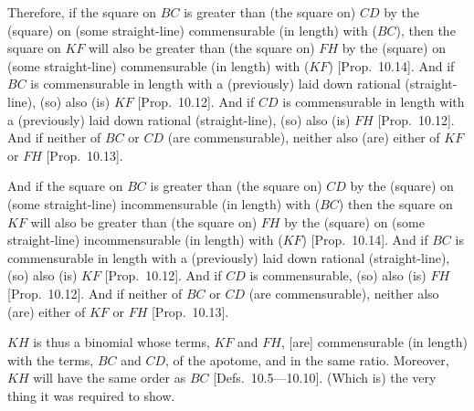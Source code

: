 \begin{Parallel}{}{}
{Therefore,  if the square on $BC$ is greater than (the square on) $CD$
by the (square) on (some straight-line) commensurable (in length) with ($BC$), 
then the square on $KF$ will also be greater than (the square on) $FH$
by the (square) on (some straight-line) commensurable (in length) with ($KF$) [Prop.~10.14]. And if $BC$ is commensurable
in length with a (previously) laid down rational (straight-line), (so) also (is) $KF$
[Prop.~10.12].
And if $CD$ is commensurable in length with a (previously) laid
down rational (straight-line), (so) also  (is) $FH$ [Prop.~10.12]. And if neither of $BC$ or $CD$
(are commensurable), neither also (are) either of $KF$ or $FH$ [Prop.~10.13].

And if the square on $BC$ is greater than (the square on) $CD$
by the (square) on (some straight-line) incommensurable (in length) with ($BC$) then
the square on $KF$ will also be greater than (the square on) $FH$
by the (square) on (some straight-line) incommensurable (in length) with ($KF$) [Prop.~10.14]. And if $BC$ is commensurable
in length with a (previously) laid down rational (straight-line), (so) also (is) $KF$
[Prop.~10.12].
And if $CD$ is commensurable, (so) also (is) $FH$ [Prop.~10.12]. And if neither of $BC$ or $CD$
(are commensurable), neither also (are) either of $KF$ or $FH$ [Prop.~10.13].

$KH$ is thus a binomial whose terms, $KF$ and $FH$, [are] commensurable
(in length) with the terms, $BC$ and $CD$,  of the apotome, and in the same ratio. 
Moreover, $KH$ will have the same order as $BC$ [Defs.~10.5---10.10]. 
  (Which is) the very thing it was required to show.}
\end{Parallel}

